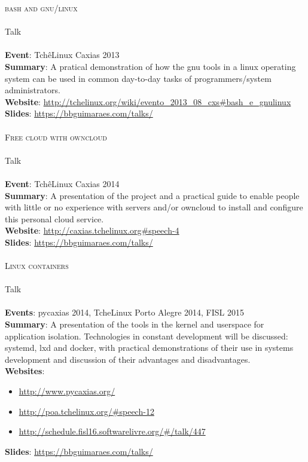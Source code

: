 \noindent
\textsc{\Large bash and gnu/linux} \\\\
Talk \\\\
\textbf{Event}: TchêLinux Caxias  2013 \\
\textbf{Summary}:
    A pratical demonstration of how the gnu tools in a linux operating system
    can be used in common day-to-day tasks of programmers/system
    administrators. \\
\textbf{Website}:
    \url{http://tchelinux.org/wiki/evento_2013_08_cxs#bash_e_gnulinux} \\
\textbf{Slides}: \url{https://bbguimaraes.com/talks/} \\\\

\noindent
\textsc{\Large Free cloud with owncloud} \\\\
Talk \\\\
\textbf{Event}: TchêLinux Caxias 2014 \\
\textbf{Summary}:
    A presentation of the project and a practical guide to enable people
    with little or no experience with servers and/or owncloud to install and
    configure this personal cloud service. \\
\textbf{Website}: \url{http://caxias.tchelinux.org#speech-4} \\
\textbf{Slides}: \url{https://bbguimaraes.com/talks/} \\\\

\noindent
\textsc{\Large Linux containers} \\\\
Talk \\\\
\textbf{Events}: pycaxias 2014, TcheLinux Porto Alegre 2014, FISL 2015 \\
\textbf{Summary}:
    A presentation of the tools in the kernel and userspace for application
    isolation. Technologies in constant development will be discussed: systemd,
    lxd and docker, with practical demonstrations of their use in systems
    development and discussion of their advantages and disadvantages. \\
\textbf{Websites}:
\begin{itemize}
    \vspace{-2.5mm}
    \itemsep-1mm
    \item \url{http://www.pycaxias.org/}
    \item \url{http://poa.tchelinux.org/#speech-12}
    \item \url{http://schedule.fisl16.softwarelivre.org/#/talk/447}
    \vspace{-2.5mm}
\end{itemize}
\textbf{Slides}: \url{https://bbguimaraes.com/talks/} \\\\\\
